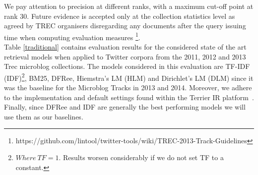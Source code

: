 

 We pay attention to precision at different ranks, with a maximum cut-off point at rank 30. Future evidence is accepted only at the collection statistics level as agreed by TREC organisers disregarding any documents after the query issuing time when computing evaluation measures \footnote{https://github.com/lintool/twitter-tools/wiki/TREC-2013-Track-Guidelines}.\\

 Table \ref{traditional} contains evaluation results for the considered state of the art retrieval models when applied to Twitter corpora from the 2011, 2012 and 2013 Trec microblog collections. The models considered in this evaluation are TF-IDF (IDF)\footnote{\(Where~TF=1.\) Results worsen considerably if we do not set TF to a constant.}, BM25, DFRee, Hiemstra's LM (HLM) and Dirichlet's LM (DLM) since it was the baseline for the Microblog Tracks in 2013 and 2014. Moreover, we adhere to the implementation and default settings found within the Terrier IR platform~\cite{ounis2005terrier}. Finally, since DFRee and IDF are generally the best performing models we will use them as our baselines.

